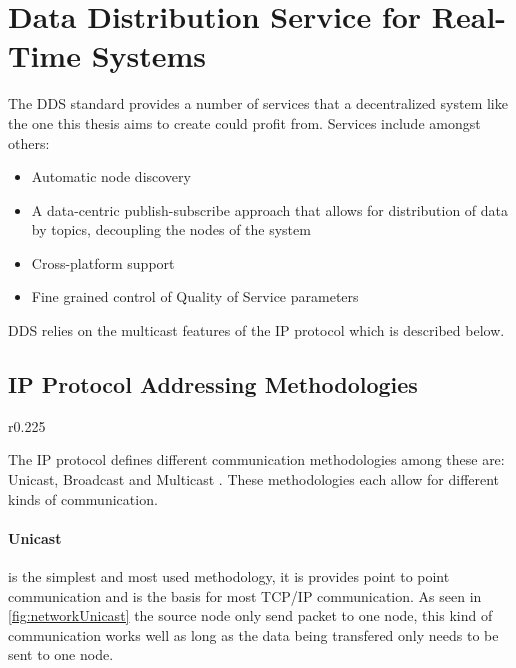 \section{Data Distribution Service for Real-Time Systems}
The DDS standard provides a number of services that a decentralized system like the one this thesis aims to create could profit from.
Services include amongst others:

\begin{itemize}
	\item Automatic node discovery
	\item A data-centric publish-subscribe approach that allows for distribution of data by topics, decoupling the nodes of the system
	\item Cross-platform support
	\item Fine grained control of Quality of Service parameters
\end{itemize}

DDS relies on the multicast features of the IP protocol which is described below.

\subsection{IP Protocol Addressing Methodologies}

\begin{wrapfigure}{r}{0.225\textwidth}
	\vspace{-20pt}
	
	\vspace{-10pt}
\end{wrapfigure}

The IP protocol defines different communication methodologies among these are: Unicast, Broadcast \cite{RFC0919_Broadcast} and Multicast \cite{RFC1112_Multicast_IGMPv1}.
These methodologies each allow for different kinds of communication.

\paragraph{Unicast} is the simplest and most used methodology, it is provides point to point communication and is the basis for most TCP/IP communication.
As seen in \cref{fig:networkUnicast} the source node only send packet to one node, this kind of communication works well as long as the data being transfered only needs to be sent to one node.

